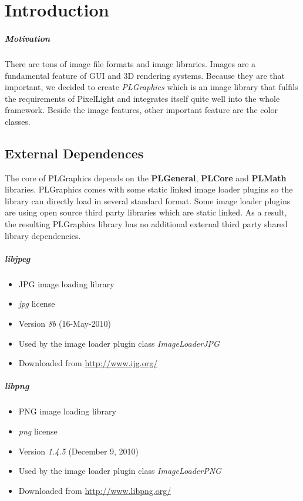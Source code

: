\chapter{Introduction}


\paragraph{Motivation}
There are tons of image file formats and image libraries. Images are a fundamental feature of GUI and 3D rendering systems. Because they are that important, we decided to create \emph{PLGraphics} which is an image library that fulfils the requirements of PixelLight and integrates itself quite well into the whole framework. Beside the image features, other important feature are the color classes.




\section{External Dependences}
The core of PLGraphics depends on the \textbf{PLGeneral}, \textbf{PLCore} and \textbf{PLMath} libraries. PLGraphics comes with some static linked image loader plugins so the library can directly load in several standard format. Some image loader plugins are using open source third party libraries which are static linked. As a result, the resulting PLGraphics library has no additional external third party shared library dependencies.


\paragraph{libjpeg}
\begin{itemize}
\item JPG image loading library
\item \emph{jpg} license
\item Version \emph{8b} (16-May-2010)
\item Used by the image loader plugin class \emph{ImageLoaderJPG}
\item Downloaded from \url{http://www.ijg.org/}
\end{itemize}


\paragraph{libpng}
\begin{itemize}
\item PNG image loading library
\item \emph{png} license
\item Version \emph{1.4.5} (December 9, 2010)
\item Used by the image loader plugin class \emph{ImageLoaderPNG}
\item Downloaded from \url{http://www.libpng.org/}
\end{itemize}
